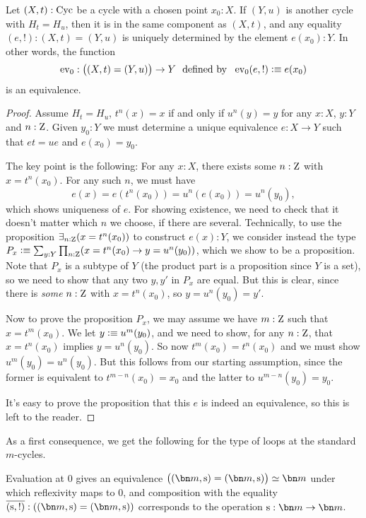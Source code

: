 \begin{lemma}\label{lem:IdCycle}
  Let $(X,t):\mathrm{Cyc}$ be a cycle with a chosen point $x_0:X$.
  If $(Y,u)$ is another cycle with $H_t=H_u$,
  then it is in the same component as $(X,t)$,
  and any equality $(e,!) : (X,t)=(Y,u)$
  is uniquely determined by the element $e(x_0):Y$.
  In other words, the function
  \[
    \ev_0:\bigl((X,t)=(Y,u)\bigr)\to Y
    \text{~~defined by~~} \ev_0(e,!) \defeq e(x_0)
  \]
  is an equivalence.
\end{lemma}
\begin{proof}
  Assume $H_t=H_u$, \ie $t^n(x)=x$ if and only if $u^n(y)=y$
  for any $x:X$, $y:Y$ and $n:\mathrm{Z}$.
  Given $y_0:Y$ we must determine a unique equivalence $e:X\to Y$
  such that $et=ue$ and $e(x_0)=y_0$.

  The key point is the following: For any $x:X$, there exists some $n:\mathrm{Z}$
  with $x=t^n(x_0)$. For any such $n$, we must have
  \[
    e(x)=e(t^n(x_0))=u^n(e(x_0))=u^n(y_0),
  \]
  which shows uniqueness of $e$.
  For showing existence, we need to check that it doesn't matter which $n$ we choose, if there are several.
  Technically, to use the proposition $\exists_{n:\mathrm{Z}}(x=t^n(x_0))$ to construct $e(x):Y$, we consider instead the type $P_x\defeq\sum_{y:Y}\prod_{n:\zet}(x=t^n(x_0) \to y=u^n(y_0))$, which we show to be a proposition.
  Note that $P_x$ is a subtype of $Y$
  (the product part is a proposition since $Y$ is a set),
  so we need to show that any two $y,y'$ in $P_x$ are equal.
  But this is clear, since there is \emph{some} $n:\mathrm{Z}$ with $x=t^n(x_0)$,
  so $y=u^n(y_0)=y'$.

  Now to prove the proposition $P_x$,
  we may assume we have $m:\mathrm{Z}$ such that $x=t^m(x_0)$.
  We let $y\defeq u^m(y_0)$, and we need to show, for any $n:\mathrm{Z}$,
  that $x=t^n(x_0)$ implies $y=u^n(y_0)$.
  So now $t^m(x_0)=t^n(x_0)$ and we must show $u^m(y_0)=u^n(y_0)$.
  But this follows from our starting assumption, since
  the former is equivalent to $t^{m-n}(x_0)=x_0$
  and the latter to $u^{m-n}(y_0)=y_0$.

  It's easy to prove the proposition that this $e$ is indeed an equivalence,
  so this is left to the reader.
\end{proof}
As a first consequence,
we get the following for the type of loops at the standard $m$-cycles.
\begin{corollary}\label{cor:id-m-cycle}
  Evaluation at $0$ gives an equivalence
  $\bigl((\bn m,\zs)=(\bn m,\zs)\bigr) \equiv \bn m$ under which
  reflexivity maps to $0$, and composition with the equality
  $\pathpair{\zs}{!}: ((\bn m,\zs)=(\bn m,\zs))$
  corresponds to the operation $\zs:\bn m\to\bn m$.
\end{corollary}

